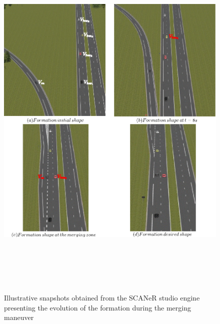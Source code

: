      \begin{figure}[!h]
        \centering 
        \includegraphics[width=14cm,height=18cm,keepaspectratio]{chapters/Chapitre_6/Figures/Scenario_2/Formation_Reconfiguration_Scenario2.pdf}
        \caption{Illustrative snapshots obtained from the SCANeR studio engine presenting the evolution of the formation during the merging maneuver}
        \label{fig:scenario02:formation_shape}
        \end{figure}













